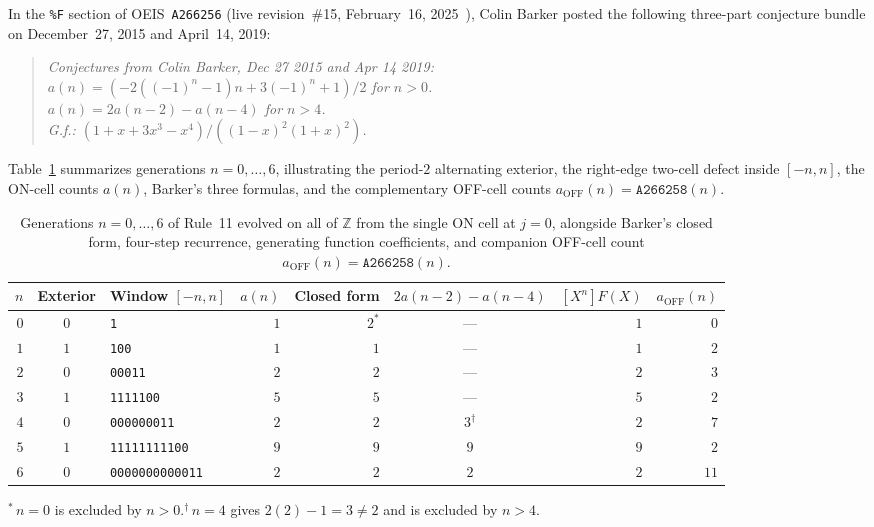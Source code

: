 \documentclass[11pt]{article}
\theoremstyle{definition}
\newcommand{\Z}{\mathbb{Z}}
\newcommand{\seq}[1]{\texttt{#1}}
\begin{document}
In the \texttt{\%F} section of OEIS~\seq{A266256} (live revision~\#15, February~16, 2025~\cite{oeis266256}), Colin Barker posted the following three-part conjecture bundle on December~27, 2015 and April~14, 2019:
\begin{quote}\itshape
Conjectures from Colin Barker, Dec 27 2015 and Apr 14 2019:\\
$a(n) = (-2((-1)^n - 1)n + 3(-1)^n + 1)/2$ for $n > 0$.\\
$a(n) = 2a(n - 2) - a(n - 4)$ for $n > 4$.\\
G.f.: $(1 + x + 3x^3 - x^4) / ((1 - x)^2(1 + x)^2)$.
\end{quote}
Table~\ref{tab:small-n} summarizes generations $n = 0, \dots, 6$, illustrating the period-$2$ alternating exterior, the right-edge two-cell defect inside $[-n, n]$, the ON-cell counts $a(n)$, Barker's three formulas, and the complementary OFF-cell counts $a_{\mathrm{OFF}}(n) = \seq{A266258}(n)$.

\begin{table}[ht]
\centering
\caption{Generations $n = 0, \dots, 6$ of Rule~11 evolved on all of $\Z$ from the single ON cell at $j = 0$, alongside Barker's closed form, four-step recurrence, generating function coefficients, and companion OFF-cell count $a_{\mathrm{OFF}}(n) = \seq{A266258}(n)$.}
\label{tab:small-n}
\smallskip
{\small
\begin{tabular}{@{}r c l r r c r r@{}}
\toprule
$n$ & Exterior & Window $[-n, n]$ & $a(n)$ & Closed form & $2a(n-2) - a(n-4)$ & $[X^n]F(X)$ & $a_{\mathrm{OFF}}(n)$ \\
\midrule
$0$ & $0$ & \texttt{1} & $1$ & $2^*$ & --- & $1$ & $0$ \\
$1$ & $1$ & \texttt{100} & $1$ & $1$ & --- & $1$ & $2$ \\
$2$ & $0$ & \texttt{00011} & $2$ & $2$ & --- & $2$ & $3$ \\
$3$ & $1$ & \texttt{1111100} & $5$ & $5$ & --- & $5$ & $2$ \\
$4$ & $0$ & \texttt{000000011} & $2$ & $2$ & $3^\dagger$ & $2$ & $7$ \\
$5$ & $1$ & \texttt{11111111100} & $9$ & $9$ & $9$ & $9$ & $2$ \\
$6$ & $0$ & \texttt{0000000000011} & $2$ & $2$ & $2$ & $2$ & $11$ \\
\bottomrule
\end{tabular}

\smallskip
{\footnotesize ${}^*$\,$n = 0$ is excluded by $n > 0$.\quad ${}^\dagger$\,$n = 4$ gives $2(2) - 1 = 3 \ne 2$ and is excluded by $n > 4$.}
}
\end{table}
\end{document}
